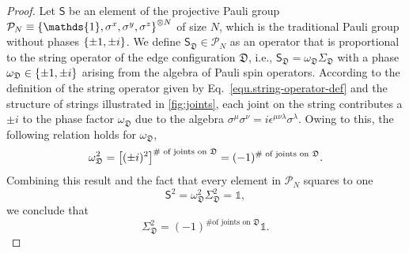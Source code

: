 \begin{proof}
    Let $\mathsf{S}$ be an element of the projective Pauli group $\mathcal{P}_N \equiv \lrg{\mathds{1}, \sigma^x, \sigma^y, \sigma^z}^{\otimes N}$ of size $N$, which is the traditional Pauli group without phases $\left\{ \pm 1, \pm i \right\}$. We define $\mathsf{S}_{\mathfrak{D}} \in \mathcal{P}_N$ as an operator that is proportional to the string operator of the edge configuration $\mathfrak{D}$, i.e., $\mathsf{S}_\mathfrak{D} = \omega_\mathfrak{D} \Sigma_\mathfrak{D}$ with a phase $\omega_\mathfrak{D}\in\left\{ \pm1, \pm i \right\}$ arising from the algebra of Pauli spin operators. According to the definition of the string operator given by Eq.~\eqref{equ.string-operator-def}
    and the structure of strings illustrated in \autoref{fig:joints}, each joint on the string contributes a $\pm i$ to the phase factor $\omega_\mathfrak{D}$ due to the algebra $\sigma^\mu\sigma^\nu = i\epsilon^{\mu\nu\lambda}\sigma^\lambda$. Owing to this, the following relation holds for $\omega_\mathfrak{D}$,
    \[
    \omega_\mathfrak{D}^2 = \left[ (\pm i)^{2} \right]^{\text{\# of joints on $\mathfrak{D}$}} = (-1)^{\text{\# of joints on $\mathfrak{D}$}}.
    \]
    Combining this result and the fact that every element in $\mathcal{P}_N$ squares to one
    \[
    \mathsf{S}^2 = \omega_\mathfrak{D}^2\Sigma_\mathfrak{D}^2  = \mathds{1},
    \]
    we conclude that 
    \begin{equation}\label{eq:sigma-joints}
        \Sigma_\mathfrak{D}^2 = (-1)^{\text{\# of joints on $\mathfrak{D}$}} \mathds{1}.
    \end{equation}
    

\end{proof}
